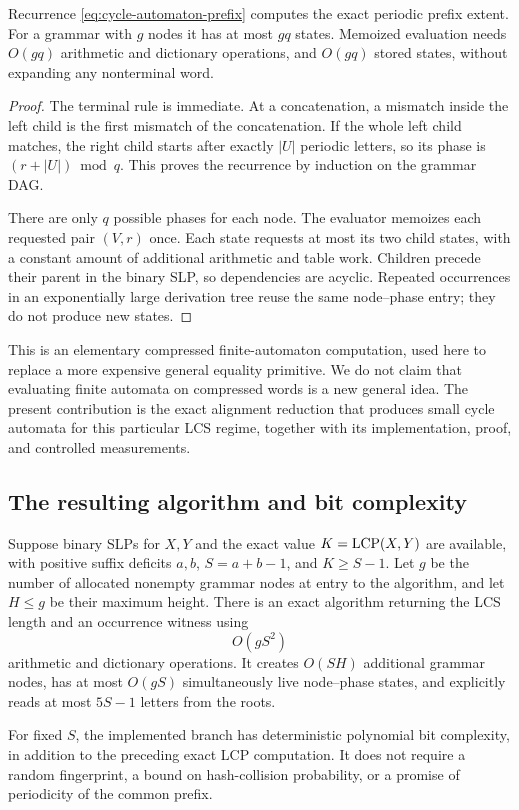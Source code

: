 \begin{proposition}
\label{prop:cycle-automaton}
Recurrence \eqref{eq:cycle-automaton-prefix} computes the exact periodic
prefix extent. For a grammar with $g$ nodes it has at most $gq$ states.
Memoized evaluation needs $O(gq)$ arithmetic and dictionary operations,
and $O(gq)$ stored states, without expanding any nonterminal word.
\end{proposition}

\begin{proof}
The terminal rule is immediate. At a concatenation, a mismatch inside
the left child is the first mismatch of the concatenation. If the whole
left child matches, the right child starts after exactly $|U|$ periodic
letters, so its phase is $(r+|U|)\bmod q$. This proves the recurrence
by induction on the grammar DAG.

There are only $q$ possible phases for each node. The evaluator memoizes
each requested pair $(V,r)$ once. Each state requests at most its two
child states, with a constant amount of additional arithmetic and table
work. Children precede their parent in the binary SLP, so dependencies
are acyclic. Repeated occurrences in an exponentially large derivation
tree reuse the same node--phase entry; they do not produce new states.
\end{proof}

This is an elementary compressed finite-automaton computation, used here
to replace a more expensive general equality primitive. We do not claim
that evaluating finite automata on compressed words is a new general
idea. The present contribution is the exact alignment reduction that
produces small cycle automata for this particular LCS regime, together
with its implementation, proof, and controlled measurements.

\subsection{The resulting algorithm and bit complexity}

\begin{theorem}
\label{thm:near-prefix-lcs}
Suppose binary SLPs for $X,Y$ and the exact value $K=\operatorname{LCP}(X,Y)$ are
available, with positive suffix deficits $a,b$, $S=a+b-1$, and
$K\ge S-1$. Let $g$ be the number of allocated nonempty grammar nodes
at entry to the algorithm, and let $H\le g$ be their maximum height.
There is an exact algorithm returning the LCS length and an occurrence
witness using
\[
 O(gS^2)
\]
arithmetic and dictionary operations. It creates $O(SH)$ additional
grammar nodes, has at most $O(gS)$ simultaneously live node--phase
states, and explicitly reads at most $5S-1$ letters from the roots.

For fixed $S$, the implemented branch has deterministic polynomial bit
complexity, in addition to the preceding exact LCP computation. It does
not require a random fingerprint, a bound on hash-collision probability,
or a promise of periodicity of the common prefix.
\end{theorem}

